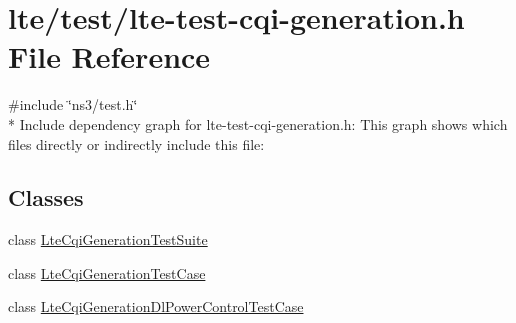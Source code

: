 \hypertarget{lte-test-cqi-generation_8h}{}\section{lte/test/lte-\/test-\/cqi-\/generation.h File Reference}
\label{lte-test-cqi-generation_8h}
{\ttfamily \#include \char`\"{}ns3/test.\+h\char`\"{}}\\*
Include dependency graph for lte-\/test-\/cqi-\/generation.h\+:
This graph shows which files directly or indirectly include this file\+:
\subsection*{Classes}
\begin{DoxyCompactItemize}
\item 
class \hyperlink{classLteCqiGenerationTestSuite}{Lte\+Cqi\+Generation\+Test\+Suite}
\item 
class \hyperlink{classLteCqiGenerationTestCase}{Lte\+Cqi\+Generation\+Test\+Case}
\item 
class \hyperlink{classLteCqiGenerationDlPowerControlTestCase}{Lte\+Cqi\+Generation\+Dl\+Power\+Control\+Test\+Case}
\end{DoxyCompactItemize}
